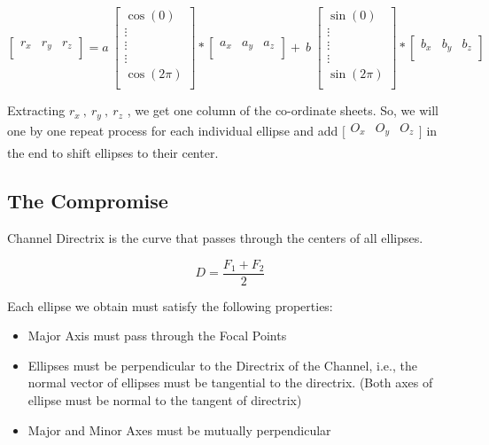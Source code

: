 \documentclass[a4paper]{article}
\begin{document}
\[\begin{bmatrix}
r_{x} & r_{y} & r_{z} \\
\end{bmatrix} = a\ \begin{bmatrix}
\cos(0) \\
 \vdots \\
 \vdots \\
 \vdots \\
\cos(2\pi) \\
\end{bmatrix}*\begin{bmatrix}
a_{x} & a_{y} & a_{z} \\
\end{bmatrix} + \ b\ \begin{bmatrix}
\sin(0) \\
 \vdots \\
 \vdots \\
 \vdots \\
\sin(2\pi) \\
\end{bmatrix}*\begin{bmatrix}
b_{x} & b_{y} & b_{z} \\
\end{bmatrix}\]

Extracting \(r_{x}\ ,\ r_{y}\ ,\ r_{z}\) , we get one column of the co-ordinate sheets. So, we will one by one repeat process for each individual ellipse and add \(\big[\begin{matrix} O_{x} & O_{y} & O_{z} \\ \end{matrix}\big]\) in the end to shift ellipses to their center.

\hypertarget{the-compromise}{%
\subsection{The Compromise}\label{the-compromise}}

Channel Directrix is the curve that passes through the centers of all
ellipses.

\[D = \frac{F_{1} + F_{2}}{2}\]

Each ellipse we obtain must satisfy the following properties:

\begin{itemize}
\item
  Major Axis must pass through the Focal Points
\item
  Ellipses must be perpendicular to the Directrix of the Channel, i.e.,
  the normal vector of ellipses must be tangential to the directrix. (Both axes
  of ellipse must be normal to the tangent of directrix)
\item
  Major and Minor Axes must be mutually perpendicular
\end{itemize}
\end{document}
